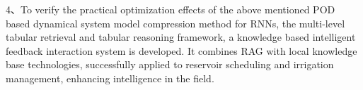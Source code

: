 \begin{eabstract}
        4、To verify the practical optimization effects of the above mentioned POD based dynamical system model compression method for RNNs, the multi-level tabular retrieval and tabular reasoning framework, a knowledge based intelligent feedback interaction system is developed. It combines RAG with local knowledge base technologies, successfully applied to reservoir scheduling and irrigation management, enhancing intelligence in the field.
        
    \end{eabstract}
    
    